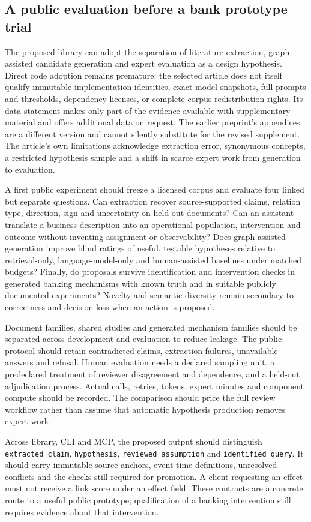 \subsection{A public evaluation before a bank prototype trial}
\label{exec20:hypothesis-prototype}
The proposed library can adopt the separation of literature extraction, graph-assisted candidate generation and expert evaluation as a design hypothesis. Direct code adoption remains premature: the selected article does not itself qualify immutable implementation identities, exact model snapshots, full prompts and thresholds, dependency licenses, or complete corpus redistribution rights. Its data statement makes only part of the evidence available with supplementary material and offers additional data on request. The earlier preprint's appendices are a different version and cannot silently substitute for the revised supplement. The article's own limitations acknowledge extraction error, synonymous concepts, a restricted hypothesis sample and a shift in scarce expert work from generation to evaluation.\citep{exec20_hypothesis_generation}

A first public experiment should freeze a licensed corpus and evaluate four linked but separate questions. Can extraction recover source-supported claims, relation type, direction, sign and uncertainty on held-out documents? Can an assistant translate a business description into an operational population, intervention and outcome without inventing assignment or observability? Does graph-assisted generation improve blind ratings of useful, testable hypotheses relative to retrieval-only, language-model-only and human-assisted baselines under matched budgets? Finally, do proposals survive identification and intervention checks in generated banking mechanisms with known truth and in suitable publicly documented experiments? Novelty and semantic diversity remain secondary to correctness and decision loss when an action is proposed.

Document families, shared studies and generated mechanism families should be separated across development and evaluation to reduce leakage. The public protocol should retain contradicted claims, extraction failures, unavailable answers and refusal. Human evaluation needs a declared sampling unit, a predeclared treatment of reviewer disagreement and dependence, and a held-out adjudication process. Actual calls, retries, tokens, expert minutes and component compute should be recorded. The comparison should price the full review workflow rather than assume that automatic hypothesis production removes expert work.

Across library, CLI and MCP, the proposed output should distinguish \texttt{extracted\_claim}, \texttt{hypothesis}, \texttt{reviewed\_assumption} and \texttt{identified\_query}. It should carry immutable source anchors, event-time definitions, unresolved conflicts and the checks still required for promotion. A client requesting an effect must not receive a link score under an effect field. These contracts are a concrete route to a useful public prototype; qualification of a banking intervention still requires evidence about that intervention.

